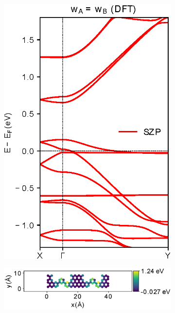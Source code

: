 \begin{figure}[h]
	\centering
	\begin{subfigure}[b]{0.3\textwidth}
		\centering
		\includegraphics[width=\textwidth]{Figures/MS2ODFT.eps}
		\vspace{-1.5\baselineskip}
		\caption{}
		\label{MS2ODFT}
	\end{subfigure}
	\hspace{20pt}
	\begin{subfigure}[b]{0.3\textwidth}
		\centering
		\includegraphics[width=\textwidth]{Figures/MS2O.eps}

\end{subfigure}
\end{figure}
